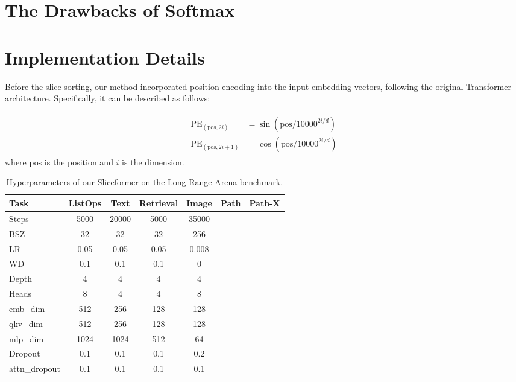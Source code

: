 \newpage
\appendix
\section{The Drawbacks of Softmax}\label{app:numerical}

\section{Implementation Details}\label{app:exp}

Before the slice-sorting, our method incorporated position encoding into the input embedding vectors, following the original Transformer~\cite{vaswani2017attention} architecture. Specifically, it can be described as follows:

\begin{eqnarray}\label{eq:ss}
\begin{aligned}
    \text{PE}_{(\text{pos}, 2i)}&=\sin(\text{pos}/10000^{2i/d})\\
    \text{PE}_{(\text{pos}, 2i+1)}&=\cos(\text{pos}/10000^{2i/d})
\end{aligned}
\end{eqnarray}
where pos is the position and $i$ is the dimension.

\begin{table}[htbp]
  \centering
  \caption{Hyperparameters of our Sliceformer on the Long-Range Arena benchmark.}
    \begin{tabular}{l|cccccc}
    \hline\hline
    Task  & ListOps & Text  & Retrieval & Image & Path  & Path-X \\
    \hline
    Steps & 5000  & 20000 & 5000  & 35000 &       &  \\
    BSZ   & 32    & 32    & 32    & 256   &       &  \\
    LR    & 0.05  & 0.05  & 0.05  & 0.008 &       &  \\
    WD    & 0.1   & 0.1   & 0.1   & 0     &       &  \\
    Depth & 4     & 4     & 4     & 4     &       &  \\
    Heads & 8     & 4     & 4     & 8     &       &  \\
    emb\_dim & 512   & 256   & 128   & 128   &       &  \\
    qkv\_dim & 512   & 256   & 128   & 128   &       &  \\
    mlp\_dim & 1024  & 1024  & 512   & 64    &       &  \\
    Dropout & 0.1   & 0.1   & 0.1   & 0.2   &       &  \\
    attn\_dropout & 0.1   & 0.1   & 0.1   & 0.1   &       &  \\
    \hline\hline
    \end{tabular}%
  \label{tab:hp}%
\end{table}%



